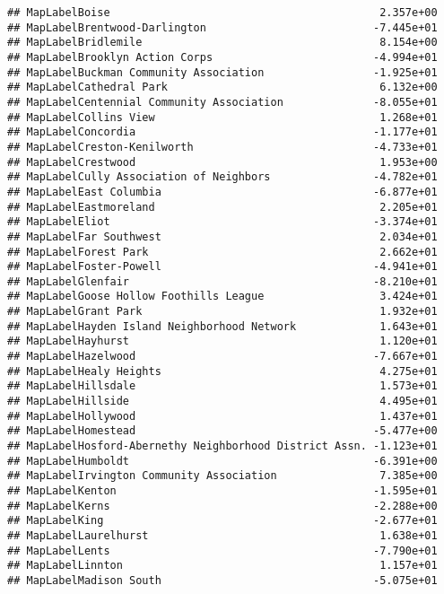 \documentclass[]{article}
\begin{document}
\begin{verbatim}
## MapLabelBoise                                          2.357e+00
## MapLabelBrentwood-Darlington                          -7.445e+01
## MapLabelBridlemile                                     8.154e+00
## MapLabelBrooklyn Action Corps                         -4.994e+01
## MapLabelBuckman Community Association                 -1.925e+01
## MapLabelCathedral Park                                 6.132e+00
## MapLabelCentennial Community Association              -8.055e+01
## MapLabelCollins View                                   1.268e+01
## MapLabelConcordia                                     -1.177e+01
## MapLabelCreston-Kenilworth                            -4.733e+01
## MapLabelCrestwood                                      1.953e+00
## MapLabelCully Association of Neighbors                -4.782e+01
## MapLabelEast Columbia                                 -6.877e+01
## MapLabelEastmoreland                                   2.205e+01
## MapLabelEliot                                         -3.374e+01
## MapLabelFar Southwest                                  2.034e+01
## MapLabelForest Park                                    2.662e+01
## MapLabelFoster-Powell                                 -4.941e+01
## MapLabelGlenfair                                      -8.210e+01
## MapLabelGoose Hollow Foothills League                  3.424e+01
## MapLabelGrant Park                                     1.932e+01
## MapLabelHayden Island Neighborhood Network             1.643e+01
## MapLabelHayhurst                                       1.120e+01
## MapLabelHazelwood                                     -7.667e+01
## MapLabelHealy Heights                                  4.275e+01
## MapLabelHillsdale                                      1.573e+01
## MapLabelHillside                                       4.495e+01
## MapLabelHollywood                                      1.437e+01
## MapLabelHomestead                                     -5.477e+00
## MapLabelHosford-Abernethy Neighborhood District Assn. -1.123e+01
## MapLabelHumboldt                                      -6.391e+00
## MapLabelIrvington Community Association                7.385e+00
## MapLabelKenton                                        -1.595e+01
## MapLabelKerns                                         -2.288e+00
## MapLabelKing                                          -2.677e+01
## MapLabelLaurelhurst                                    1.638e+01
## MapLabelLents                                         -7.790e+01
## MapLabelLinnton                                        1.157e+01
## MapLabelMadison South                                 -5.075e+01

\end{verbatim}
\end{document}

